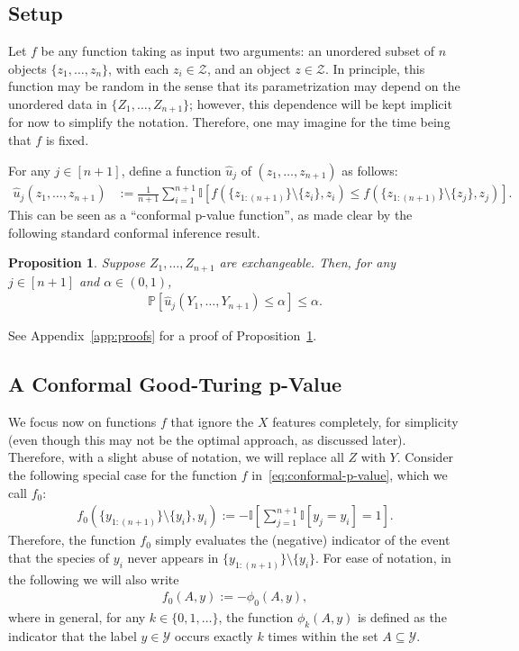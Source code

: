 \documentclass[11pt]{article}
\newtheorem{proposition}{Proposition}
\renewcommand{\P}[1]{\mathbb{P}\left[#1\right]}
\newcommand{\I}[1]{\mathbb{I}\left[#1\right]}
\begin{document}
\subsection{Setup} \label{sec:methods-setup}

Let $f$ be any function taking as input two arguments: an unordered subset of $n$ objects $\{z_1,\ldots,z_n\}$, with each $z_i \in \mathcal{Z}$, and an object $z \in \mathcal{Z}$. In principle, this function may be random in the sense that its parametrization may depend on the unordered data in $\{Z_1,\ldots,Z_{n+1}\}$; however, this dependence will be kept implicit for now to simplify the notation. Therefore, one may imagine for the time being that $f$ is fixed.

For any $j \in [n+1]$, define a function $\hat{u}_j$ of $(z_1,\ldots,z_{n+1})$ as follows:
\begin{align} \label{eq:conformal-p-value}
  \hat{u}_j(z_1,\ldots,z_{n+1})
  & := \frac{1}{n+1} \sum_{i=1}^{n+1} \I{ f(\{z_{1:(n+1)}\} \setminus \{z_i\}, z_{i}) \leq f(\{z_{1:(n+1)}\} \setminus \{z_j\}, z_{j}) } .
\end{align}
This can be seen as a ``conformal p-value function'', as made clear by the following standard conformal inference result.


\begin{proposition} \label{prop:super-unif}
Suppose $Z_1,\ldots,Z_{n+1}$ are exchangeable.
Then, for any $j \in [n+1]$ and $\alpha \in (0,1)$,
\begin{align*}
  \P{\hat{u}_j(Y_1, \ldots, Y_{n+1}) \leq \alpha} \leq \alpha.
\end{align*}
\end{proposition}
See Appendix~\ref{app:proofs} for a proof of Proposition~\ref{prop:super-unif}.


\subsection{A Conformal Good-Turing p-Value} \label{sec:gt-pval}

We focus now on functions $f$ that ignore the $X$ features completely, for simplicity (even though this may not be the optimal approach, as discussed later).
Therefore, with a slight abuse of notation, we will replace all $Z$ with $Y$.
Consider the following special case for the function $f$ in~\eqref{eq:conformal-p-value}, which we call $f_0$:
\begin{align} \label{eq:def-f0}
  f_0(\{y_{1:(n+1)}\} \setminus \{y_i\}, y_{i})
   := - \I{\sum_{j=1}^{n+1} \I{y_j = y_{i}}=1}.
\end{align}
Therefore, the function $f_0$ simply evaluates the (negative) indicator of the event that the species of $y_{i}$ never appears in $\{y_{1:(n+1)}\} \setminus \{y_i\}$.
For ease of notation, in the following we will also write
\begin{align*}
  f_0(A, y)
   := - \phi_0\left( A, y \right),
\end{align*}
where in general, for any $k \in \{0,1,\ldots\}$, the function $\phi_k(A, y)$ is defined as the indicator that the label $y \in \mathcal{Y}$ occurs exactly $k$ times within the set $A \subseteq \mathcal{Y}$.
\end{document}

